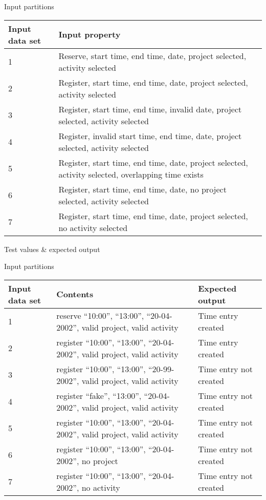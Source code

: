 Input partitions
\begin{center}
  \begin{tabular}{| l | l |}
    \hline
	Input data set & Input property \\ \hline
     1 & Reserve,  start time, end time, date, project selected, activity selected \\ \hline
     2 & Register, start time, end time, date, project selected, activity selected \\ \hline
     3 & Register, start time, end time, invalid date, project selected, activity selected \\ \hline
     4 & Register, invalid start time, end time, date, project selected, activity selected \\ \hline
     5 & Register, start time, end time, date, project selected, activity selected, overlapping time exists \\ \hline
     6 & Register, start time, end time, date, no project selected, activity selected \\ \hline
     7 & Register, start time, end time, date, project selected, no activity selected \\ \hline
  \end{tabular}
\end{center}


Test values \& expected output

Input partitions
\begin{center}
  \begin{tabular}{| l | l | l |}
    \hline
	Input data set & Contents & Expected output \\ \hline
    1 & reserve  ``10:00'', ``13:00'', ``20-04-2002'', valid project, valid activity & Time entry created  \\ \hline
    2 & register ``10:00'', ``13:00'', ``20-04-2002'', valid project, valid activity & Time entry created  \\ \hline
    3 & register ``10:00'', ``13:00'', ``20-99-2002'', valid project, valid activity & Time entry not created  \\ \hline
    4 & register ``fake'',  ``13:00'', ``20-04-2002'', valid project, valid activity & Time entry not created  \\ \hline
    5 & register ``10:00'', ``13:00'', ``20-04-2002'', valid project, valid activity & Time entry not created  \\ \hline
    6 & register ``10:00'', ``13:00'', ``20-04-2002'', no project & Time entry not created  \\ \hline
    7 & register ``10:00'', ``13:00'', ``20-04-2002'', no activity & Time entry not created  \\ \hline
  \end{tabular}
\end{center}